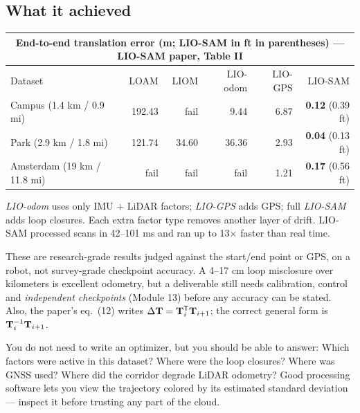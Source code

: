 \subsection{What it achieved}
\begin{center}\small
\begin{tabular}{lrrrrr}\toprule
\multicolumn{6}{c}{\textbf{End-to-end translation error (m; LIO-SAM in ft in parentheses) --- LIO-SAM paper, Table II}}\\\midrule
Dataset & LOAM & LIOM & LIO-odom & LIO-GPS & LIO-SAM\\\midrule
Campus (1.4 km / 0.9 mi) & 192.43 & fail & 9.44 & 6.87 & \textbf{0.12} (0.39 ft)\\
Park (2.9 km / 1.8 mi) & 121.74 & 34.60 & 36.36 & 2.93 & \textbf{0.04} (0.13 ft)\\
Amsterdam (19 km / 11.8 mi) & fail & fail & fail & 1.21 & \textbf{0.17} (0.56 ft)\\\bottomrule
\end{tabular}\end{center}
\textit{LIO-odom} uses only IMU + LiDAR factors; \textit{LIO-GPS} adds GPS; full \textit{LIO-SAM} adds loop closures. Each extra factor type removes another layer of drift. LIO-SAM processed scans in 42--101 ms and ran up to 13$\times$ faster than real time.

\begin{improve}
These are research-grade results judged against the start/end point or GPS, on a robot, not survey-grade checkpoint accuracy. A 4--17 cm loop misclosure over kilometers is excellent odometry, but a deliverable still needs calibration, control and \emph{independent checkpoints} (Module 13) before any accuracy can be stated. Also, the paper's eq.\ (12) writes $\Delta\mathbf{T}=\mathbf{T}_i^{\mathsf T}\mathbf{T}_{i+1}$; the correct general form is $\mathbf{T}_i^{-1}\mathbf{T}_{i+1}$.
\end{improve}

\begin{tip}
You do not need to write an optimizer, but you should be able to answer: Which factors were active in this dataset? Where were the loop closures? Where was GNSS used? Where did the corridor degrade LiDAR odometry? Good processing software lets you view the trajectory colored by its estimated standard deviation --- inspect it before trusting any part of the cloud.
\end{tip}

